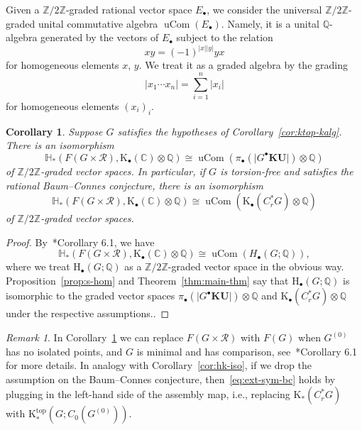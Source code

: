 \documentclass[a4paper,reqno]{amsart}
\theoremstyle{plain}
\newtheorem{corollary}[theorem]{Corollary}
\theoremstyle{definition}
\theoremstyle{remark}
\newtheorem{remark}[theorem]{Remark}
\numberwithin{equation}{section}
\newcommand{\rH}{\mathrm{H}}
\newcommand{\rK}{\mathrm{K}}
\newcommand{\cR}{\mathcal{R}}
\newcommand{\dC}{\mathbb{C}}
\newcommand{\dH}{\mathbb{H}}
\newcommand{\dQ}{\mathbb{Q}}
\newcommand{\dZ}{\mathbb{Z}}
\newcommand{\absv}[1]{\left| #1\right|}
\newcommand{\gr}[1]{\lvert #1\rvert}
\newcommand{\KU}{\mathbf{KU}}
\DeclareMathOperator{\uCom}{uCom}
\begin{document}
Given a $\dZ/2\dZ$-graded rational vector space $E_\bullet$, we consider the universal $\dZ/2\dZ$-graded unital commutative algebra $\uCom(E_\bullet)$.
Namely, it is a unital $\dQ$-algebra generated by the vectors of $E_\bullet$ subject to the relation
\[
x y = (-1)^{\absv{x} \absv{y}} y x
\]
for homogeneous elements $x$, $y$.
We treat it as a graded algebra by the grading
\[
\absv{x_1 \cdots x_n} = \sum_{i = 1}^n \absv{x_i}
\]
for homogeneous elements $(x_i)_i$.

\begin{corollary}\label{cor:fg-ext-sym}
Suppose $G$ satisfies the hypotheses of Corollary~\ref{cor:ktop-kalg}. There is an isomorphism
\[
\dH_*(F(G\times\mathcal{R}), \rK_\bullet(\dC)\otimes \dQ) \cong \uCom(\pi_\bullet(\gr{G^\bullet\KU}) \otimes \dQ)
\]
of $\dZ/2\dZ$-graded vector spaces.
In particular, if $G$ is torsion-free and satisfies the rational Baum--Connes conjecture, there is an isomorphism
\begin{equation}\label{eq:ext-sym-bc}
\dH_*(F(G\times\mathcal{R}), \rK_\bullet(\dC)\otimes \dQ)  \cong \uCom(\rK_\bullet(C^*_r G)\otimes \dQ)
\end{equation}
of $\dZ/2\dZ$-graded vector spaces. 
\end{corollary}

\begin{proof}
By~\cite{li:algk}*{Corollary 6.1}, we have
\[
\dH_*(F(G\times\mathcal{R}), \rK_\bullet(\dC)\otimes \dQ) \cong \uCom(H_\bullet(G; \dQ)),
\]
where we treat $\rH_\bullet(G; \dQ)$ as a $\dZ/2\dZ$-graded vector space in the obvious way.
Proposition~\ref{prop:s-hom} and Theorem~\ref{thm:main-thm} say that $\rH_\bullet(G; \dQ)$ is isomorphic to the graded vector spaces $\pi_\bullet(\gr{G^\bullet\KU}) \otimes \dQ$ and $\rK_\bullet(C^*_r G)\otimes \dQ$ under the respective assumptions..
\end{proof}

\begin{remark}\label{rem:fgr-fg}
In Corollary~\ref{cor:fg-ext-sym} we can replace $F(G\times \cR)$ with $F(G)$ when $G^{(0)}$ has no isolated points, and $G$ is minimal and has comparison, see~\cite{li:algk}*{Corollary 6.1} for more details.
In analogy with Corollary~\ref{cor:hk-iso}, if we drop the assumption on the Baum--Connes conjecture, then~\eqref{eq:ext-sym-bc} holds by plugging in the left-hand side of the assembly map, i.e., replacing $\rK_*(C^*_r G)$ with $\rK_*^{\mathrm{top}}(G; C_0(G^{(0)}))$.
\end{remark}
\end{document}

